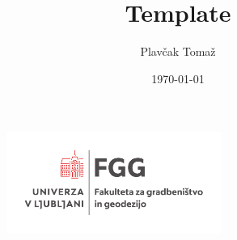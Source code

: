 \begin{figure}
    \centering
    \includegraphics[width=7cm]{Img/UL_FGG-logoVER-CMYK_barv.pdf}
\end{figure}
  


\title{Template}
\author{Plavčak Tomaž}
\date{\today}

\def\doctype{Poročilo}
\def\institucija{UL FGG}
\def\kraj{Ljubljana}

\makeatletter
\let\newtitle\@title
\let\newauthor\@author
\let\newdate\@date
\makeatother


\maketitle
\thispagestyle{empty}